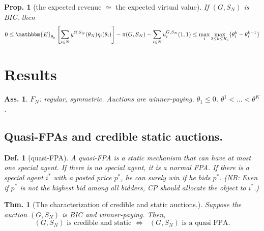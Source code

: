 \documentclass[11pt,a4paper,dvipdfmx]{article}
\theoremstyle{plain}
\newtheorem{thm}{Thm.}[section]
\newtheorem{prop}{Prop.}[section]
\newtheorem{df}{Def.}[section]
\newtheorem{ass}{Ass.}
\newcommand{\equi}{\Longleftrightarrow}
\newcommand{\E}{\mathbbm{E}}
\newcommand{\1}{\mathbbm{1}}
\begin{document}
\begin{prop}[the expected revenue $\simeq$ the expected virtual value] \label{bound}
	If $(G, S_N)$ is BIC, then
	\[
	0 \leq 
	\E_{\theta_n} \left[ \sum_{i \in N} y^{G, S_N}(\theta_N) \eta_i(\theta_i) \right]
	- \pi(G, S_N)
	- \sum_{i \in N} u_i^{G, S_N}(1, 1)
	\leq \max_i \max_{2 \leq k \leq K_i} \{\theta_i^k - \theta_i^{k-1}\}
	\]
\end{prop}


\section{Results}
\begin{ass}
	$F_N$: regular, symmetric. Auctions are winner-paying. $\theta_1 \leq 0$. $\theta^1 < \dots < \theta^K$. 
\end{ass}

\subsection{Quasi-FPAs and credible static auctions.}
\begin{df}[quasi-FPA]
	A quasi-FPA is a static mechanism that can have at most one special agent. If there is no special agent, it is a normal FPA. If there is a special agent $i^*$ with a posted price $p^*$, he can surely win if he bids $p^*$. (NB: Even if $p^*$ is not the highest bid among all bidders, CP should allocate the object to $i^*$.)
\end{df}

\begin{screen}
\begin{thm}[The characterization of credible and static auctions.] \label{thm_fpa}
	Suppose the auction $(G, S_N)$ is BIC and winner-paying. Then,
	\[
	\text{$(G, S_N)$ is credible and static $\equi$ $(G, S_N)$ is a quasi FPA.}
	\]
\end{thm}
\end{screen}
\end{document}
